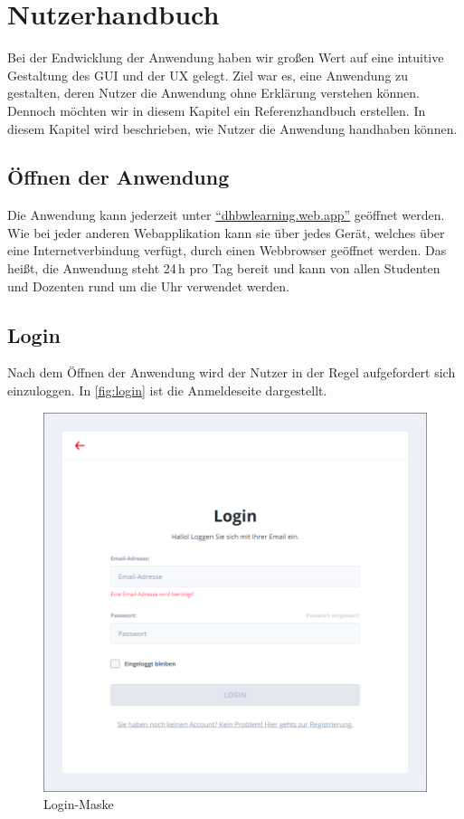 \chapter{Nutzerhandbuch} %
Bei der Endwicklung der Anwendung haben wir großen Wert auf eine intuitive Gestaltung des \ac{GUI} und der \ac{UX} gelegt. Ziel war es, eine Anwendung zu gestalten, deren Nutzer die Anwendung ohne Erklärung verstehen können.
Dennoch möchten wir in diesem Kapitel ein Referenzhandbuch erstellen.
In diesem Kapitel wird beschrieben, wie Nutzer die Anwendung handhaben können.

\section{Öffnen der Anwendung}
Die Anwendung kann jederzeit unter \href{https://dhbwlearning.web.app}{\enquote{dhbwlearning.web.app}} geöffnet werden.
Wie bei jeder anderen Webapplikation kann sie über jedes Gerät, welches über eine Internetverbindung verfügt, durch einen Webbrowser geöffnet werden. Das heißt, die Anwendung steht 24\,h pro Tag bereit und kann von allen Studenten und Dozenten rund um die Uhr verwendet werden.

\section{Login}
Nach dem Öffnen der Anwendung wird der Nutzer in der Regel aufgefordert sich einzuloggen.
In \autoref{fig:login} ist die Anmeldeseite dargestellt.

\begin{figure}[h]
    \centering
    \includegraphics[width=.7\textwidth]{img/Login.png}
    \caption{Login-Maske}
    \label{fig:login}
\end{figure}

